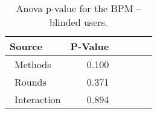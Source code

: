 
\begin{table}[!htb]
\centering
\caption{Anova p-value for the BPM -- blinded users.}
\label{tab:blocanova_bpm_two_way_blind}
\begin{tabular}{lrrrrr}
\toprule
          Source & P-Value \\
\midrule
    \    Methods &   0.100 \\
     \    Rounds &   0.371 \\
\    Interaction &   0.894 \\
\bottomrule
\end{tabular}
\end{table}

